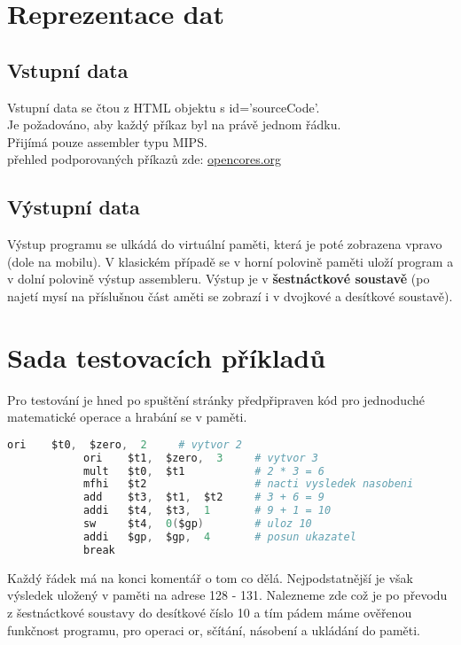 \documentclass[a4paper,titlepage]{article}
\begin{document}
\section{Reprezentace dat}
	\subsection{Vstupní data}
		Vstupní data se čtou z HTML objektu  s id='sourceCode'.\\
		Je požadováno, aby každý příkaz byl na právě jednom řádku.\\
		Přijímá pouze assembler typu MIPS.\\
		přehled podporovaných příkazů zde: \small{\href{https://opencores.org/project,plasma,opcodes#opcodes}{opencores.org}}\\

	\subsection{Výstupní data}
		Výstup programu se ulkádá do virtuální paměti, která je poté zobrazena vpravo (dole na mobilu).
		V klasickém případě se v horní polovině paměti uloží program a v dolní polovině výstup assembleru.
		Výstup je v \textbf{šestnáctkové soustavě} (po najetí mysí na příslušnou část aměti se zobrazí i v dvojkové a desítkové soustavě).

\section{Sada testovacích příkladů}
		Pro testování je hned po spuštění stránky předpřipraven kód pro jednoduché matematické operace a hrabání se v paměti.
		\begin{lstlisting}[language=Assembler]
			ori    $t0,  $zero,  2     # vytvor 2
			ori    $t1,  $zero,  3     # vytvor 3
			mult   $t0,  $t1           # 2 * 3 = 6
			mfhi   $t2                 # nacti vysledek nasobeni
			add    $t3,  $t1,  $t2     # 3 + 6 = 9
			addi   $t4,  $t3,  1       # 9 + 1 = 10
			sw     $t4,  0($gp)        # uloz 10
			addi   $gp,  $gp,  4       # posun ukazatel
			break
		\end{lstlisting}
		Každý řádek má na konci komentář o tom co dělá.
		Nejpodstatnější je však výsledek uložený v paměti na adrese 128 - 131.
		Nalezneme zde  což je po převodu z šestnáctkové soustavy do desítkové číslo 10 a
		tím pádem máme ověřenou funkčnost programu, pro operaci or, sčítání, násobení a ukládání do paměti.\\
		
\end{document}
